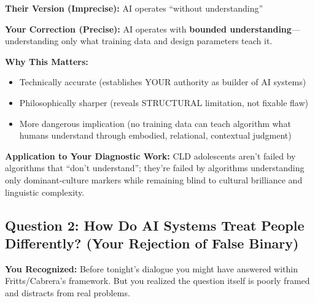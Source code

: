 \documentclass[12pt,letterpaper]{article}
\begin{document}
\begin{keyfindings}
\textbf{Their Version (Imprecise):} AI operates ``without understanding''

\textbf{Your Correction (Precise):} AI operates with \textbf{bounded understanding}---understanding only what training data and design parameters teach it. 

\textbf{Why This Matters:}
\begin{itemize}[leftmargin=*,noitemsep,font=\small]
    \item Technically accurate (establishes YOUR authority as builder of AI systems)
    \item Philosophically sharper (reveals STRUCTURAL limitation, not fixable flaw)
    \item More dangerous implication (no training data can teach algorithm what humans understand through embodied, relational, contextual judgment)
\end{itemize}
\end{keyfindings}

\textbf{Application to Your Diagnostic Work:} CLD adolescents aren't failed by algorithms that ``don't understand''; they're failed by algorithms understanding only dominant-culture markers while remaining blind to cultural brilliance and linguistic complexity.

\subsection{Question 2: How Do AI Systems Treat People Differently? (Your Rejection of False Binary)}

\textbf{You Recognized:} Before tonight's dialogue you might have answered within Fritts/Cabrera's framework. But you realized the question itself is poorly framed and distracts from real problems.

\end{document}

